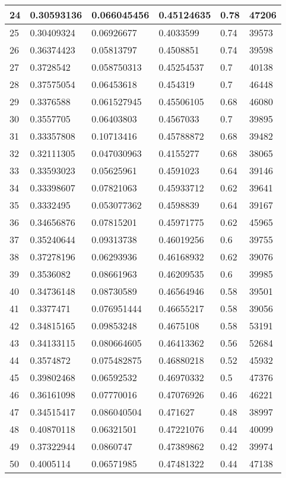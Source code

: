 \begin{longtable}{|l|l|l|l|l|l|}
24 & 0.30593136 & 0.066045456 & 0.45124635 & 0.78 & 47206 \\ \hline 
25 & 0.30409324 & 0.06926677 & 0.4033599 & 0.74 & 39573 \\ \hline 
26 & 0.36374423 & 0.05813797 & 0.4508851 & 0.74 & 39598 \\ \hline 
27 & 0.3728542 & 0.058750313 & 0.45254537 & 0.7 & 40138 \\ \hline 
28 & 0.37575054 & 0.06453618 & 0.454319 & 0.7 & 46448 \\ \hline 
29 & 0.3376588 & 0.061527945 & 0.45506105 & 0.68 & 46080 \\ \hline 
30 & 0.3557705 & 0.06403803 & 0.4567033 & 0.7 & 39895 \\ \hline 
31 & 0.33357808 & 0.10713416 & 0.45788872 & 0.68 & 39482 \\ \hline 
32 & 0.32111305 & 0.047030963 & 0.4155277 & 0.68 & 38065 \\ \hline 
33 & 0.33593023 & 0.05625961 & 0.4591023 & 0.64 & 39146 \\ \hline 
34 & 0.33398607 & 0.07821063 & 0.45933712 & 0.62 & 39641 \\ \hline 
35 & 0.3332495 & 0.053077362 & 0.4598839 & 0.64 & 39167 \\ \hline 
36 & 0.34656876 & 0.07815201 & 0.45971775 & 0.62 & 45965 \\ \hline 
37 & 0.35240644 & 0.09313738 & 0.46019256 & 0.6 & 39755 \\ \hline 
38 & 0.37278196 & 0.06293936 & 0.46168932 & 0.62 & 39076 \\ \hline 
39 & 0.3536082 & 0.08661963 & 0.46209535 & 0.6 & 39985 \\ \hline 
40 & 0.34736148 & 0.08730589 & 0.46564946 & 0.58 & 39501 \\ \hline 
41 & 0.3377471 & 0.076951444 & 0.46655217 & 0.58 & 39056 \\ \hline 
42 & 0.34815165 & 0.09853248 & 0.4675108 & 0.58 & 53191 \\ \hline 
43 & 0.34133115 & 0.080664605 & 0.46413362 & 0.56 & 52684 \\ \hline 
44 & 0.3574872 & 0.075482875 & 0.46880218 & 0.52 & 45932 \\ \hline 
45 & 0.39802468 & 0.06592532 & 0.46970332 & 0.5 & 47376 \\ \hline 
46 & 0.36161098 & 0.07770016 & 0.47076926 & 0.46 & 46221 \\ \hline 
47 & 0.34515417 & 0.086040504 & 0.471627 & 0.48 & 38997 \\ \hline 
48 & 0.40870118 & 0.06321501 & 0.47221076 & 0.44 & 40099 \\ \hline 
49 & 0.37322944 & 0.0860747 & 0.47389862 & 0.42 & 39974 \\ \hline 
50 & 0.4005114 & 0.06571985 & 0.47481322 & 0.44 & 47138 \\ \hline 
\end{longtable}